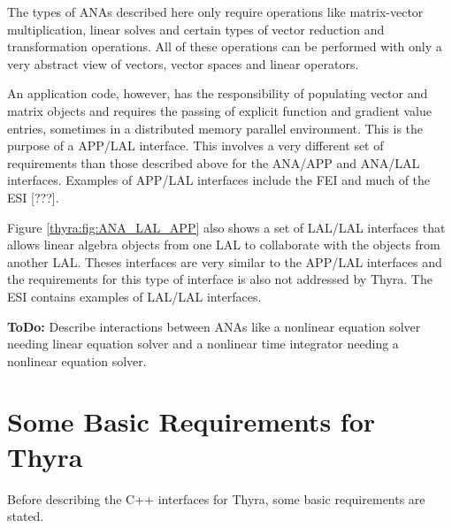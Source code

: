 \documentclass[pdf,ps2pdf,11pt]{SANDreport}
\begin{document}
The types of ANAs described here only require operations like matrix-vector
multiplication, linear solves and certain types of vector reduction and
transformation operations.  All of these operations can be performed with only
a very abstract view of vectors, vector spaces and linear operators.

An application code, however, has the responsibility of populating vector and
matrix objects and requires the passing of explicit function and gradient
value entries, sometimes in a distributed memory parallel environment.  This
is the purpose of a APP/LAL interface.  This involves a very different set of
requirements than those described above for the ANA/APP and ANA/LAL
interfaces.  Examples of APP/LAL interfaces include the FEI {}\cite{ref:fei}
and much of the ESI [???].

Figure {}\ref{thyra:fig:ANA_LAL_APP} also shows a set of LAL/LAL interfaces
that allows linear algebra objects from one LAL to collaborate with the
objects from another LAL.  Theses interfaces are very similar to the APP/LAL
interfaces and the requirements for this type of interface is also not
addressed by Thyra.  The ESI {}\cite{ref:esi_2001} contains examples of
LAL/LAL interfaces.

{}\textbf{ToDo:} Describe interactions between ANAs like a nonlinear equation
solver needing linear equation solver and a nonlinear time integrator needing
a nonlinear equation solver.

%
\section{Some Basic Requirements for Thyra}
\label{thyra:sec:Thyra_requirements}
%

Before describing the C++ interfaces for Thyra, some basic requirements are
stated.
\end{document}
